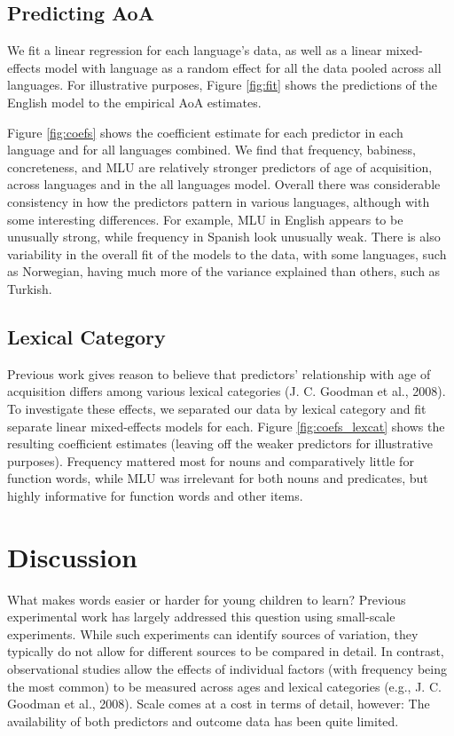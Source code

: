 \documentclass[10pt, letterpaper]{article}
\begin{document}
\subsection{Predicting AoA}\label{predicting-aoa}

We fit a linear regression for each language's data, as well as a linear
mixed-effects model with language as a random effect for all the data
pooled across all languages. For illustrative purposes, Figure
\ref{fig:fit} shows the predictions of the English model to the
empirical AoA estimates.

Figure \ref{fig:coefs} shows the coefficient estimate for each predictor
in each language and for all languages combined. We find that frequency,
babiness, concreteness, and MLU are relatively stronger predictors of
age of acquisition, across languages and in the all languages model.
Overall there was considerable consistency in how the predictors pattern
in various languages, although with some interesting differences. For
example, MLU in English appears to be unusually strong, while frequency
in Spanish look unusually weak. There is also variability in the overall
fit of the models to the data, with some languages, such as Norwegian,
having much more of the variance explained than others, such as Turkish.

\subsection{Lexical Category}\label{lexical-category}

Previous work gives reason to believe that predictors' relationship with
age of acquisition differs among various lexical categories (J. C.
Goodman et al., 2008). To investigate these effects, we separated our
data by lexical category and fit separate linear mixed-effects models
for each. Figure \ref{fig:coefs_lexcat} shows the resulting coefficient
estimates (leaving off the weaker predictors for illustrative purposes).
Frequency mattered most for nouns and comparatively little for function
words, while MLU was irrelevant for both nouns and predicates, but
highly informative for function words and other items.

\section{Discussion}\label{discussion}

What makes words easier or harder for young children to learn? Previous
experimental work has largely addressed this question using small-scale
experiments. While such experiments can identify sources of variation,
they typically do not allow for different sources to be compared in
detail. In contrast, observational studies allow the effects of
individual factors (with frequency being the most common) to be measured
across ages and lexical categories (e.g., J. C. Goodman et al., 2008).
Scale comes at a cost in terms of detail, however: The availability of
both predictors and outcome data has been quite limited.
\end{document}
